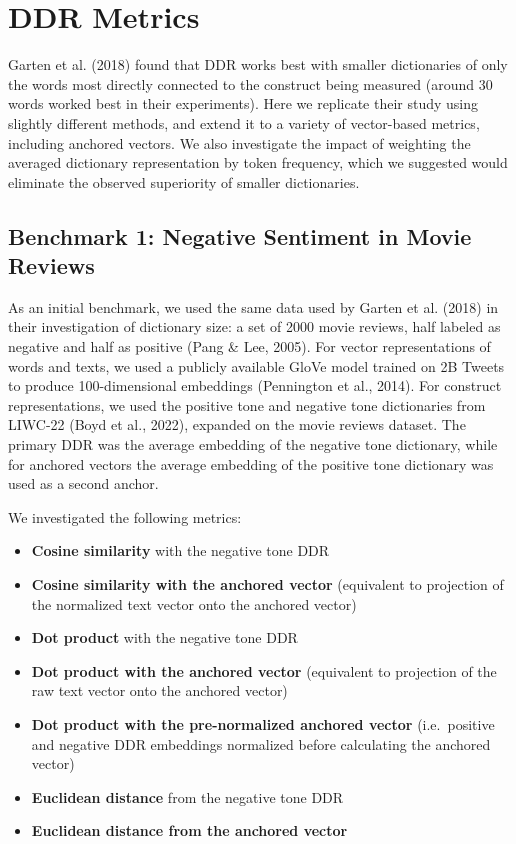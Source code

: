 \documentclass[
  man,
  floatsintext,
  longtable,
  nolmodern,
  notxfonts,
  notimes,
  colorlinks=true,linkcolor=blue,citecolor=blue,urlcolor=blue]{apa7}
\providecommand{\tightlist}{%
  \setlength{\itemsep}{0pt}\setlength{\parskip}{0pt}}
\begin{document}
\appendix

\section{DDR Metrics}\label{ddr-metrics}

Garten et al. (2018) found that DDR works best with smaller dictionaries
of only the words most directly connected to the construct being
measured (around 30 words worked best in their experiments). Here we
replicate their study using slightly different methods, and extend it to
a variety of vector-based metrics, including anchored vectors. We also
investigate the impact of weighting the averaged dictionary
representation by token frequency, which we suggested would eliminate
the observed superiority of smaller dictionaries.

\subsection{Benchmark 1: Negative Sentiment in Movie
Reviews}\label{benchmark-1-negative-sentiment-in-movie-reviews}

As an initial benchmark, we used the same data used by Garten et al.
(2018) in their investigation of dictionary size: a set of 2000 movie
reviews, half labeled as negative and half as positive (Pang \& Lee,
2005). For vector representations of words and texts, we used a publicly
available GloVe model trained on 2B Tweets to produce 100-dimensional
embeddings (Pennington et al., 2014). For construct representations, we
used the positive tone and negative tone dictionaries from LIWC-22 (Boyd
et al., 2022), expanded on the movie reviews dataset. The primary DDR
was the average embedding of the negative tone dictionary, while for
anchored vectors the average embedding of the positive tone dictionary
was used as a second anchor.

We investigated the following metrics:

\begin{itemize}
\tightlist
\item
  \textbf{Cosine similarity} with the negative tone DDR
\item
  \textbf{Cosine similarity with the anchored vector} (equivalent to
  projection of the normalized text vector onto the anchored vector)
\item
  \textbf{Dot product} with the negative tone DDR
\item
  \textbf{Dot product with the anchored vector} (equivalent to
  projection of the raw text vector onto the anchored vector)
\item
  \textbf{Dot product with the pre-normalized anchored vector}
  (i.e.~positive and negative DDR embeddings normalized before
  calculating the anchored vector)
\item
  \textbf{Euclidean distance} from the negative tone DDR
\item
  \textbf{Euclidean distance from the anchored vector}
\end{itemize}
\end{document}
